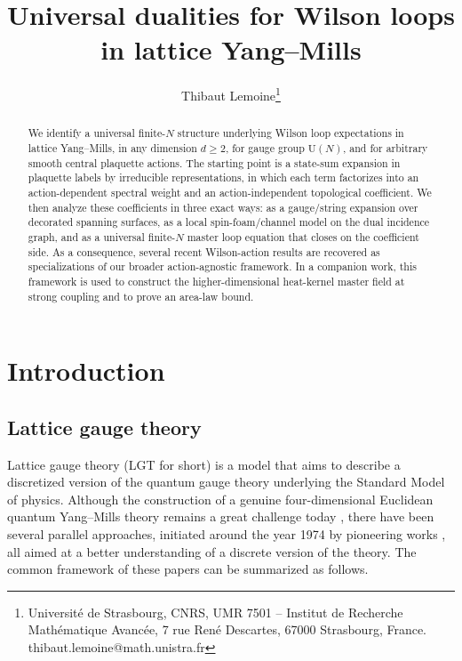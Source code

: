 \documentclass[11pt,a4paper,reqno]{article}
\title{Universal dualities for Wilson loops in lattice Yang--Mills}
\author{Thibaut Lemoine\thanks{Universit\'e de Strasbourg, CNRS, UMR 7501 -- Institut de Recherche Math\'ematique Avanc\'ee, 7 rue Ren\'e Descartes, 67000 Strasbourg, France. thibaut.lemoine@math.unistra.fr}}
\theoremstyle{definition}
\theoremstyle{remark}
\begin{document}
\maketitle

\begin{abstract}
We identify a universal finite-$N$ structure underlying Wilson loop expectations in lattice Yang--Mills, in any dimension $d\geq 2$, for gauge group $\mathrm{U}(N)$, and for arbitrary smooth central plaquette actions. The starting point is a state-sum expansion in plaquette labels by irreducible representations, in which each term factorizes into an action-dependent spectral weight and an action-independent topological coefficient. We then analyze these coefficients in three exact ways: as a gauge/string expansion over decorated spanning surfaces, as a local spin-foam/channel model on the dual incidence graph, and as a universal finite-$N$ master loop equation that closes on the coefficient side. As a consequence, several recent Wilson-action results are recovered as specializations of our broader action-agnostic framework. In a companion work, this framework is used to construct the higher-dimensional heat-kernel master field at strong coupling and to prove an area-law bound.
\end{abstract}

\tableofcontents

\section{Introduction}\label{sec:intro}

\subsection{Lattice gauge theory}

Lattice gauge theory (LGT for short) is a model that aims to describe a discretized version of the quantum gauge theory underlying the Standard Model of physics. Although the construction of a genuine four-dimensional Euclidean quantum Yang--Mills theory remains a great challenge today \cite{JW}, there have been several parallel approaches, initiated around the year 1974 by pioneering works \cite{Wil74,Hoo74,Mig75}, all aimed at a better understanding of a discrete version of the theory. The common framework of these papers can be summarized as follows.
\end{document}
